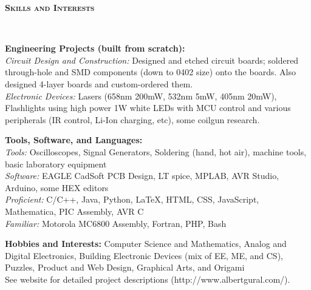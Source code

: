 \documentclass{article}
\newenvironment{changemargin}[2]{%
  \begin{list}{}{%
    \setlength{\topsep}{0pt}%
    \setlength{\leftmargin}{#1}%
    \setlength{\rightmargin}{#2}%
    \setlength{\listparindent}{\parindent}%
    \setlength{\itemindent}{\parindent}%
    \setlength{\parsep}{\parskip}%
  }%
  \item[]}{\end{list}
}
\newcommand{\lineover}{
	\begin{changemargin}{-0.05in}{-0.05in}
		\vspace*{-8pt}
		\hrulefill \\
		\vspace*{-2pt}
	\end{changemargin}
}
\newcommand{\header}[1]{
	\begin{changemargin}{-0.5in}{-0.5in}
		{\large \textbf{\scshape{#1}}}\\
  	\lineover
	\end{changemargin}
}
\newenvironment{body} {
	\vspace*{-16pt}
	\begin{changemargin}{-0.25in}{-0.5in}
  }	
	{\end{changemargin}
}
\begin{document}
\smallskip


\header{Skills and Interests}

\begin{body}
	\vspace{14pt}
	\textbf{Engineering Projects (built from scratch):} \\
	\textit{Circuit Design and Construction:} Designed and etched circuit boards; soldered through-hole and SMD components (down to 0402 size) onto the boards.  Also designed 4-layer boards and custom-ordered them.\\
	\textit{Electronic Devices:} Lasers (658nm 200mW, 532nm 5mW, 405nm 20mW), Flashlights using high power 1W white LEDs with MCU control and various peripherals (IR control, Li-Ion charging, etc), some coilgun research. \\
	
	\medskip

	\textbf{Tools, Software, and Languages:} \\
	\textit{Tools:} Oscilloscopes, Signal Generators, Soldering (hand, hot air), machine tools, basic laboratory equipment \\
	\textit{Software:} EAGLE CadSoft PCB Design, LT spice, MPLAB, AVR Studio, Arduino, some HEX editors \\
	\textit{Proficient:} C/C++, Java, Python, \LaTeX, HTML, CSS, JavaScript, Mathematica, PIC Assembly, AVR C \\ 
	\textit{Familiar:} Motorola MC6800 Assembly, Fortran, PHP, Bash \\

	\medskip

	\textbf{Hobbies and Interests:} Computer Science and Mathematics, Analog and Digital Electronics, Building Electronic Devices (mix of EE, ME, and CS), Puzzles, Product and Web Design, Graphical Arts, and Origami \\ See website for detailed project descriptions (http://www.albertgural.com/). \\
\end{body}

\smallskip
\end{document}
